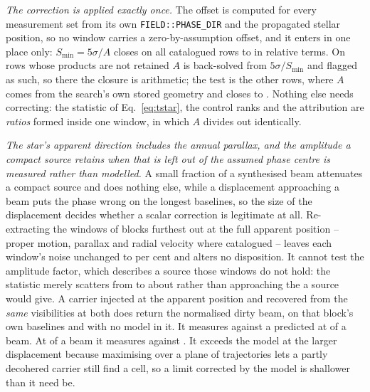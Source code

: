 \emph{The correction is applied exactly once.} The offset is computed for
every measurement set from its own \texttt{FIELD::PHASE\_DIR} and the
propagated stellar position, so no window carries a zero-by-assumption
offset, and it enters in one place only: $S_{\min}=5\sigma/A$ closes on all
\PbSminClosed{} catalogued rows to \PbSminWorstRes{} in relative terms. On
\PbSminTaut{} rows whose products are not retained $A$ is back-solved from
$5\sigma/S_{\min}$ and flagged as such, so there the closure is arithmetic;
the test is the other \PbSminIndep{} rows, where $A$ comes from the search's
own stored geometry and closes to \PbSminIndepRes. Nothing else needs
correcting: the statistic of
Eq.~\ref{eq:tstar}, the control ranks and the attribution are \emph{ratios}
formed inside one window, in which $A$ divides out identically.

\emph{The star's apparent direction includes the annual parallax, and the
amplitude a compact source retains when that is left out of the assumed phase
centre is measured rather than modelled.} A small fraction of a synthesised
beam attenuates a compact source and does nothing else, while a displacement
approaching a beam puts the phase wrong on the longest baselines, so the size
of the displacement decides whether a scalar correction is legitimate at all.
Re-extracting the \SensNReextWin{} windows of \SensNReextBlock{} blocks
furthest out at the full apparent position -- proper motion, parallax and
radial velocity where catalogued -- leaves each window's noise unchanged to
\SensReextNoiseMaxPct{} per cent and alters no disposition. It cannot test the
amplitude factor, which describes a source those windows do not hold: the
statistic merely scatters from \SensReTstarLo{} to \SensReTstarHi{} about
\SensReTstarMed{} rather than approaching the \SensPxLargePred{} a source
would give. A carrier injected at the apparent position and recovered from the
\emph{same} visibilities at both does return the normalised dirty beam, on
that block's own baselines and with no model in it. It measures
\SensPxSmallMeas{} against a predicted \SensPxSmallPred{} at
\SensPxSmallBeams{} of a beam. At \SensPxLargeBeams{} of a beam it measures
\SensPxLargeMeas{} against \SensPxLargePred. It
exceeds the model at the larger displacement because maximising over a plane
of trajectories lets a partly decohered carrier still find a cell, so a limit
corrected by the model is shallower than it need be.

